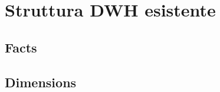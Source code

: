 \section{Struttura DWH esistente}
    \subsection{Facts}
        
        
    \subsection{Dimensions}
        